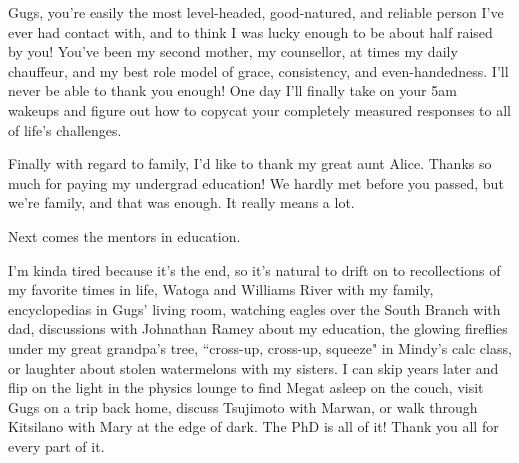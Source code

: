Gugs, you're easily the most level-headed, good-natured, and reliable person I've ever had contact with, and to think I was lucky enough to be about half raised by you! You've been my second mother, my counsellor, at times my daily chauffeur, and my best role model of grace, consistency, and even-handedness. I'll never be able to thank you enough! One day I'll finally take on your 5am wakeups and figure out how to copycat your completely measured responses to all of life's challenges.

Finally with regard to family, I'd like to thank my great aunt Alice. Thanks so much for paying my undergrad education! We hardly met before you passed, but we're family, and that was enough. It really means a lot.

Next comes the mentors in education. 


I'm kinda tired because it's the end, so it's natural to drift on to recollections of my favorite times in life, Watoga and Williams River with my family, encyclopedias in Gugs' living room, watching eagles over the South Branch with dad, discussions with Johnathan Ramey about my education, the glowing fireflies under my great grandpa's tree, ``cross-up, cross-up, squeeze" in Mindy's calc class, or laughter about stolen watermelons with my sisters. I can skip years later and flip on the light in the physics lounge to find Megat asleep on the couch, visit Gugs on a trip back home, discuss Tsujimoto with Marwan, or walk through Kitsilano with Mary at the edge of dark. The PhD is all of it! Thank you all for every part of it.
